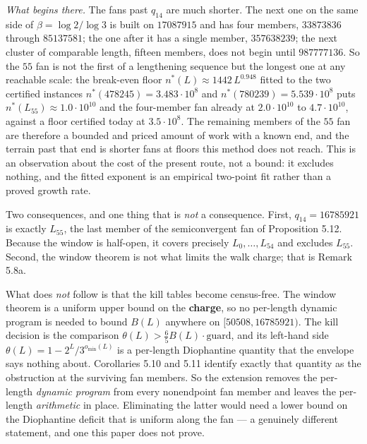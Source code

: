 \documentclass[12pt]{article}
\begin{document}
\emph{What begins there.} The fans past \(q_{14}\) are much shorter. The
next one on the same side of \(\beta=\log2/\log3\) is built on
\(17087915\) and has four members, \(33873836\) through \(85137581\);
the one after it has a single member, \(357638239\); the next cluster of
comparable length, fifteen members, does not begin until \(987777136\).
So the \(55\) fan is not the first of a lengthening sequence but the
longest one at any reachable scale: the break-even floor
\(n^{*}(L)\approx1442\,L^{0.948}\) fitted to the two certified instances
\(n^{*}(478245)=3.483\cdot10^{8}\) and
\(n^{*}(780239)=5.539\cdot10^{8}\) puts
\(n^{*}(L_{55})\approx1.0\cdot10^{10}\) and the four-member fan already
at \(2.0\cdot10^{10}\) to \(4.7\cdot10^{10}\), against a floor certified
today at \(3.5\cdot10^{8}\). The remaining members of the \(55\) fan are
therefore a bounded and priced amount of work with a known end, and the
terrain past that end is shorter fans at floors this method does not
reach. This is an observation about the cost of the present route, not a
bound: it excludes nothing, and the fitted exponent is an empirical
two-point fit rather than a proved growth rate.

Two consequences, and one thing that is \emph{not} a consequence. First,
\(q_{14}=16785921\) is exactly \(L_{55}\), the last member of the
semiconvergent fan of Proposition 5.12. Because the window is half-open,
it covers precisely \(L_0,\ldots,L_{54}\) and excludes \(L_{55}\).
Second, the window theorem is not what limits the walk charge; that is
Remark 5.8a.

What does \emph{not} follow is that the kill tables become census-free.
The window theorem is a uniform upper bound on the \textbf{charge}, so
no per-length dynamic program is needed to bound \(B(L)\) anywhere on
\([50508,16785921)\). The kill decision is the comparison
\(\theta(L)>\tfrac65B(L)\cdot\text{guard}\), and its left-hand side
\(\theta(L)=1-2^L/3^{o_{\min}(L)}\) is a per-length Diophantine quantity
that the envelope says nothing about. Corollaries 5.10 and 5.11 identify
exactly that quantity as the obstruction at the surviving fan members.
So the extension removes the per-length \emph{dynamic program} from
every nonendpoint fan member and leaves the per-length \emph{arithmetic}
in place. Eliminating the latter would need a lower bound on the
Diophantine deficit that is uniform along the fan --- a genuinely
different statement, and one this paper does not prove.
\end{document}

